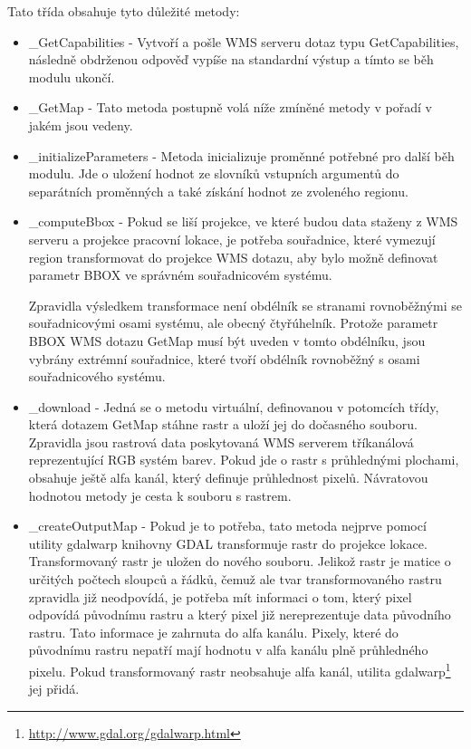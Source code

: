 \documentclass[a4paper,12pt]{article}
\begin{document}
Tato třída obsahuje tyto důležité metody:  
\begin{itemize}
  \item \_GetCapabilities - Vytvoří a pošle WMS serveru dotaz typu GetCapabilities, následně obdrženou odpověď vypíše na standardní výstup a tímto se běh modulu ukončí. 
  \item \_GetMap - Tato metoda postupně volá níže zmíněné metody v pořadí v jakém jsou vedeny. 
  \item \_initializeParameters - Metoda inicializuje proměnné potřebné pro další běh modulu. Jde o uložení hodnot ze slovníků vstupních argumentů do separátních proměnných a také získání hodnot ze zvoleného regionu.
  \item \_computeBbox - Pokud se liší projekce, ve které budou data staženy z WMS serveru a projekce pracovní lokace, je potřeba souřadnice, které vymezují region transformovat do projekce WMS dotazu, aby bylo možně definovat parametr BBOX ve správném souřadnicovém systému.

                        Zpravidla výsledkem transformace není obdélník se stranami rovnoběžnými se souřadnicovými osami systému, ale obecný čtyřúhelník. Protože parametr BBOX WMS dotazu GetMap  musí být uveden  v tomto obdélníku, jsou vybrány extrémní souřadnice, které tvoří obdélník rovnoběžný s osami souřadnicového systému.      
  \item \_download - Jedná se o metodu virtuální, definovanou v potomcích třídy, která dotazem GetMap stáhne rastr a uloží jej do dočasného souboru. Zpravidla jsou rastrová data poskytovaná WMS serverem tříkanálová reprezentující RGB systém barev. Pokud jde o rastr s průhlednými plochami, obsahuje ještě alfa kanál, který definuje průhlednost pixelů. Návratovou hodnotou metody je cesta k souboru s rastrem.
  \item \_createOutputMap - Pokud je to potřeba, tato metoda nejprve pomocí utility gdalwarp knihovny GDAL transformuje rastr do projekce lokace. Transformovaný rastr je uložen do nového souboru. 
                            Jelikož rastr je matice o určitých počtech sloupců a řádků, čemuž ale tvar transformovaného rastru zpravidla již neodpovídá, je potřeba mít informaci o tom, který pixel odpovídá původnímu rastru 
                            a který pixel již nereprezentuje data původního rastru. Tato informace je zahrnuta do alfa kanálu. Pixely, které do původnímu rastru nepatří mají hodnotu v alfa kanálu plně průhledného pixelu.  Pokud transformovaný rastr neobsahuje alfa kanál, utilita gdalwarp\footnote{\url{http://www.gdal.org/gdalwarp.html}} jej přidá.
\end{itemize}
\end{document}
